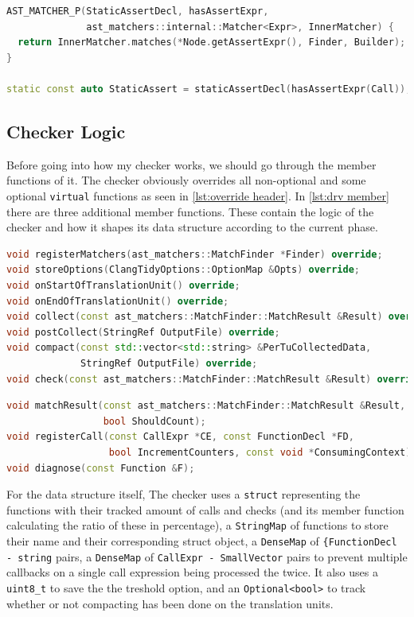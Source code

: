 \begin{lstlisting}[language={C++},caption={Custom logic and usage of a new matcher called \texttt{hasAssertExpr}.},label={lst:hasassert}]
AST_MATCHER_P(StaticAssertDecl, hasAssertExpr,
              ast_matchers::internal::Matcher<Expr>, InnerMatcher) {
  return InnerMatcher.matches(*Node.getAssertExpr(), Finder, Builder);
}

static const auto StaticAssert = staticAssertDecl(hasAssertExpr(Call));
\end{lstlisting}


\subsection{Checker Logic}

Before going into how my checker works, we should go through the member functions of it. The checker obviously overrides all
non-optional and some optional \lstinline{virtual} functions as seen in \cref{lst:override header}. In \cref{lst:drv member}
there are three additional member functions. These contain the logic of the checker and how it shapes
its data structure according to the current phase. 

\begin{lstlisting}[language={C++},caption={Overridden virtual functions in DiscardedReturnValueCheck's header.},label={lst:override header}]
void registerMatchers(ast_matchers::MatchFinder *Finder) override;
void storeOptions(ClangTidyOptions::OptionMap &Opts) override;
void onStartOfTranslationUnit() override;
void onEndOfTranslationUnit() override;
void collect(const ast_matchers::MatchFinder::MatchResult &Result) override;
void postCollect(StringRef OutputFile) override;
void compact(const std::vector<std::string> &PerTuCollectedData,
			 StringRef OutputFile) override;
void check(const ast_matchers::MatchFinder::MatchResult &Result) override;
\end{lstlisting}

\begin{lstlisting}[language={C++},caption={Private member functions in DiscardedReturnValueCheck's header.},label={lst:drv member}]
void matchResult(const ast_matchers::MatchFinder::MatchResult &Result,
                 bool ShouldCount);
void registerCall(const CallExpr *CE, const FunctionDecl *FD,
                  bool IncrementCounters, const void *ConsumingContext);
void diagnose(const Function &F);
\end{lstlisting}

For the data structure itself, The checker uses a \lstinline{struct} representing the functions with their tracked amount of calls and
checks (and its member function calculating the ratio of these in percentage), a \lstinline{StringMap} of functions to store their
name and their corresponding struct object, a \lstinline{DenseMap} of \lstinline{{FunctionDecl - string} pairs, a
\lstinline{DenseMap} of \lstinline{CallExpr - SmallVector} pairs to prevent multiple callbacks on a single call expression
being processed the twice. It also uses a \lstinline{uint8_t} to save the the treshold option, and an \lstinline{Optional<bool>} to
track whether or not compacting has been done on the translation units.

